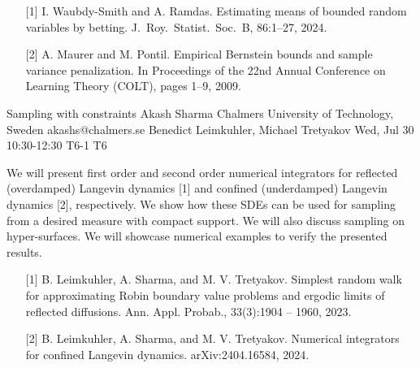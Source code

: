 \begin{talk}
\begin{enumerate}
	\item[{[1]}] I. Waubdy-Smith and A. Ramdas. Estimating means of bounded random
variables by betting. J.\ Roy.\ Statist.\ Soc.\ B, 86:1–27, 2024.
	\item[{[2]}] A. Maurer and M. Pontil. Empirical Bernstein bounds and sample variance penalization. In Proceedings of the 22nd Annual Conference
on Learning Theory (COLT), pages 1–9, 2009.
\end{enumerate}


\end{talk}

\begin{talk}
  {Sampling with constraints}%
  {Akash Sharma}%
  {Chalmers University of Technology, Sweden}%
  {akashs@chalmers.se}%
  {Benedict Leimkuhler, Michael Tretyakov}%
  {}%
  {Wed, Jul 30 10:30-12:30}%
  {T6-1}%
  {T6}%
  
				
			
 We will present first order and second order numerical integrators for reflected (overdamped) Langevin dynamics [1] and confined (underdamped) Langevin dynamics [2], respectively. We show how these SDEs can be used for sampling from a desired measure with compact support. We will also discuss sampling on hyper-surfaces. We will showcase numerical examples to verify the presented results.  

\medskip  

\begin{enumerate}
	\item[{[1]}] B. Leimkuhler, A. Sharma, and M. V. Tretyakov. Simplest random walk for approximating Robin boundary
value problems and ergodic limits of reflected diffusions. Ann. Appl. Probab., 33(3):1904 – 1960, 2023.
	\item[{[2]}] B. Leimkuhler, A. Sharma, and M. V. Tretyakov. Numerical integrators for confined Langevin dynamics.  
arXiv:2404.16584, 2024.
\end{enumerate}


\end{talk}

